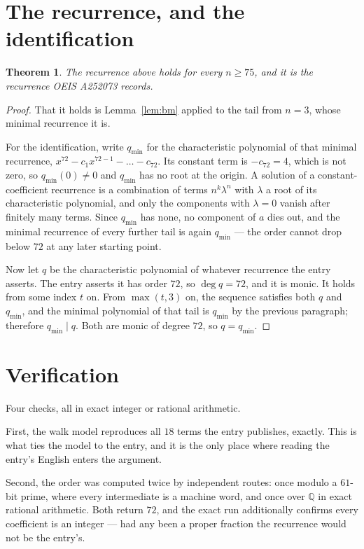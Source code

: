 \documentclass[11pt,a4paper]{article}
\theoremstyle{plain}
\newtheorem{theorem}{Theorem}
\theoremstyle{definition}
\begin{document}
\section{The recurrence, and the identification}

\begin{theorem}
The recurrence above holds for every $n\ge75$, and it is the recurrence OEIS A252073 records.
\end{theorem}

\begin{proof}
That it holds is Lemma~\ref{lem:bm} applied to the tail from $n=3$, whose minimal
recurrence it is.

For the identification, write $q_{\min}$ for the characteristic polynomial of that minimal
recurrence, $x^{72}-c_1x^{72-1}-\dots-c_{72}$. Its constant term is
$-c_{72}=4$, which is not zero, so $q_{\min}(0)\neq0$ and $q_{\min}$ has no
root at the origin. A solution of a constant-coefficient recurrence is a combination of terms
$n^{k}\lambda^{n}$ with $\lambda$ a root of its characteristic polynomial, and only the
components with $\lambda=0$ vanish after finitely many terms. Since $q_{\min}$ has none, no
component of $a$ dies out, and the minimal recurrence of every further tail is again
$q_{\min}$ --- the order cannot drop below $72$ at any later starting point.

Now let $q$ be the characteristic polynomial of whatever recurrence the entry asserts. The
entry asserts it has order $72$, so $\deg q=72$, and it is monic. It holds from some
index $t$ on. From $\max(t,3)$ on, the sequence satisfies both $q$ and $q_{\min}$, and
the minimal polynomial of that tail is $q_{\min}$ by the previous paragraph; therefore
$q_{\min}\mid q$. Both are monic of degree $72$, so $q=q_{\min}$.
\end{proof}

\section{Verification}

Four checks, all in exact integer or rational arithmetic.

First, the walk model reproduces all $18$ terms the entry publishes, exactly. This is
what ties the model to the entry, and it is the only place where reading the entry's English
enters the argument.

Second, the order was computed twice by independent routes: once modulo a $61$-bit prime, where
every intermediate is a machine word, and once over $\mathbb{Q}$ in exact rational arithmetic.
Both return $72$, and the exact run additionally confirms every coefficient is an integer
--- had any been a proper fraction the recurrence would not be the entry's.
\end{document}
